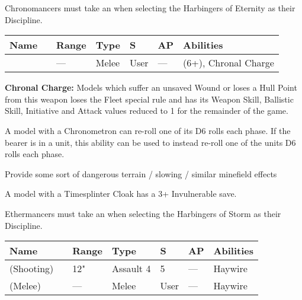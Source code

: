 



Chronomancers must take an  when selecting the Harbingers of Eternity as their Discipline.

\label{Aeonstave}
\noindent
\begin{tabular}{||m{130pt} m{10pt} m{31pt} m{55pt} m{12pt} m{12pt} m{210pt}||}
	\hline
	Name & & Range & Type & S & AP & Abilities \\
	\hline
	\quickref{Aeonstave} & & — & Melee & User & — & \quickref{Entropic Strike} (6+), Chronal Charge \\
	\hline
\end{tabular}
\textbf{Chronal Charge:} Models which suffer an unsaved Wound or loses a Hull Point from this weapon loses the Fleet special rule and has its Weapon Skill, Ballistic Skill, Initiative and Attack values reduced to 1 for the remainder of the game.


A model with a Chronometron can re-roll one of its D6 rolls each phase. If the bearer is in a unit, this ability can be used to instead re-roll one of the units D6 rolls each phase.


Provide some sort of dangerous terrain / slowing / similar minefield effects


A model with a Timesplinter Cloak has a 3+ Invulnerable save.



Ethermancers must take an  when selecting the Harbingers of Storm as their Discipline.

\label{Voltaic Staff}
\noindent
\begin{tabular}{||m{130pt} m{10pt} m{31pt} m{55pt} m{12pt} m{12pt} m{210pt}||}
	\hline
	Name & & Range & Type & S & AP & Abilities \\
	\hline
	\quickref{Voltaic Staff} (Shooting) & & 12" & Assault 4 & 5 & — & Haywire \\
	\quickref{Voltaic Staff} (Melee) & & — & Melee & User & — & Haywire \\
	\hline
\end{tabular}

